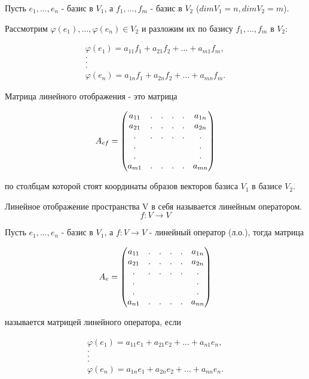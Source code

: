 \documentclass[../main.tex]{subfiles}
\begin{document}
\void
Пусть $e_1,...,e_n$ - базис в $V_1$, а $f_1,...,f_m$ - базис в $V_2$ ($dimV_1 = n, dimV_2 = m$).

Рассмотрим $\varphi(e_1),...,\varphi(e_n)\in V_2$ и разложим их по базису $f_1,...,f_m$ в $V_2$:

$$\begin{matrix}
    \varphi(e_1) = a_{11} f_1 + a_{21} f_2 + ... + a_{m1} f_m,\\
    .\\
    .\\
    .\\
    \varphi(e_n) = a_{1n} f_1 + a_{2n} f_2 + ... + a_{mn} f_m.
\end{matrix}$$

\void{} Матрица линейного отображения - это матрица

$$A_{ef} = \begin{pmatrix} 
    a_{11} & . & . & . & . & a_{1n}\\
    a_{21} & . & . & . & . & a_{2n}\\
    . & . & . & . & . & .\\
    . &  &  &  &  & .\\
    . &  &  &  &  & .\\
    a_{m1} & . & . & . & . & a_{mn}\\
\end{pmatrix}$$

по столбцам которой стоят координаты образов векторов базиса $V_1$ в базисе $V_2$.

\void{} Линейное отображение пространства V в себя называется линейным оператором.
$$f: V\rightarrow V$$

\void{} Пусть $e_1,...,e_n$ - базис в $V_1$, а $f: V\rightarrow V$ - линейный оператор (л.о.), тогда матрица

$$A_{e} = \begin{pmatrix} 
    a_{11} & . & . & . & . & a_{1n}\\
    a_{21} & . & . & . & . & a_{2n}\\
    . & . & . & . & . & .\\
    . &  &  &  &  & .\\
    . &  &  &  &  & .\\
    a_{n1} & . & . & . & . & a_{nn}\\
\end{pmatrix}$$

называется матрицей линейного оператора, если

$$\begin{matrix}
    \varphi(e_1) = a_{11} e_1 + a_{21} e_2 + ... + a_{n1} e_n,\\
    .\\
    .\\
    .\\
    \varphi(e_n) = a_{1n} e_1 + a_{2n} e_2 + ... + a_{nn} e_n.
\end{matrix}$$
\end{document}
